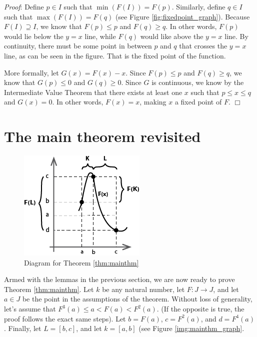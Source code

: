 \documentclass[12pt]{IEEEtran}
\begin{document}
{\it Proof}: Define $p \in I$ such that $\min \left( F \left( I \right) \right) = F \left( p \right)$. Similarly, define $q \in I$ such that $\max \left( F \left( I \right) \right) = F \left( q \right)$ (see Figure \ref{fig:fixedpoint_graph}). Because $F \left( I \right) \supseteq I$, we know that $F \left( p \right) \leq p$ and $F \left( q \right) \geq q$. In other words, $F \left( p \right)$ would lie below the $y=x$ line, while $F \left( q \right)$ would like above the $y=x$ line. By continuity, there must be some point in between $p$ and $q$ that crosses the $y=x$ line, as can be seen in the figure. That is the fixed point of the function.

More formally, let $G \left( x \right) = F \left( x \right) - x$. Since $F \left( p \right) \leq p$ and $F \left( q \right) \geq q$, we know that $G \left( p \right) \leq 0$ and $G \left( q \right) \geq 0$. Since $G$ is continuous, we know by the Intermediate Value Theorem that there exists at least one $x$ such that $p \leq x \leq q$ and $G \left( x \right) = 0$. In other words, $F \left(x \right) = x$, making $x$ a fixed point of $F$. $\Box$


\section{The main theorem revisited}

\begin{figure}
	\begin{center}
		\includegraphics{img/mainthm_graph.png}
		\caption{Diagram for Theorem \ref{thm:mainthm}}
        \label{fig:mainthm_graph}
	\end{center}
\end{figure}

Armed with the lemmas in the previous section, we are now ready to prove Theorem \ref{thm:mainthm}. Let $k$ be any natural number, let $F : J \rightarrow J$, and let $a \in J$ be the point in the assumptions of the theorem. Without loss of generality, let's assume that $F^3\left(a\right) \leq a < F\left(a\right) < F^2\left(a\right)$. (If the opposite is true, the proof follows the exact same steps). Let $b = F \left( a \right)$, $c = F ^2 \left( a \right)$, and $d = F^4  \left( a \right)$. Finally, let $L = \left[ b, c \right]$, and let $k = \left[ a,b \right]$ (see Figure \ref{img:mainthm_graph}.
\end{document}
